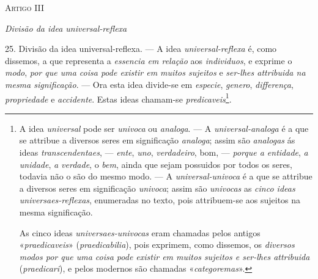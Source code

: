 \textsc{Artigo III}

\emph{Divisão da idea universal-reflexa}

25. Divisão da idea universal-reflexa. --- A idea \emph{universal-reflexa} é, como dissemos, a que representa a \emph{essencia em relação} aos \emph{individuos}, e exprime o \emph{modo}, \emph{por que uma coisa pode existir em muitos sujeitos} e \emph{ser-lhes attribuida na mesma significação}. --- Ora esta idea divide-se em \emph{especie}, \emph{genero}, \emph{differença}, \emph{propriedade} e \emph{accidente}. Estas ideas chamam-se \emph{predicaveis}\footnote{A idea \emph{universal} pode ser \emph{univoca} ou \emph{analoga}. --- A \emph{universal-analoga} é a que se attribue a diversos seres em significação \emph{analoga}; assim são \emph{analogas} ás ideas \emph{transcendentaes}, --- \emph{ente}, \emph{uno}, \emph{verdadeiro}, bom, --- \emph{porque a entidade}, \emph{a unidade}, \emph{a verdade}, o \emph{bem}, ainda que sejam possuidos por todos os seres, todavia não o são do mesmo modo. --- A \emph{universal-univoca} é a que se attribue a diversos seres em significação \emph{univoca}; assim são \emph{univocas} as \emph{cinco ideas universaes-reflexas}, enumeradas no texto, pois attribuem-se aos sujeitos na mesma significação.\par As cinco ideas \emph{universaes-univocas} eram chamadas pelos antigos «\emph{praedicaveis}» (\emph{praedicabilia}), pois exprimem, como dissemos, os \emph{diversos modos por que uma coisa pode existir em muitos sujeitos e ser-lhes attribuida} (\emph{praedicari}), e pelos modernos são chamadas «\emph{categoremas}».}.


